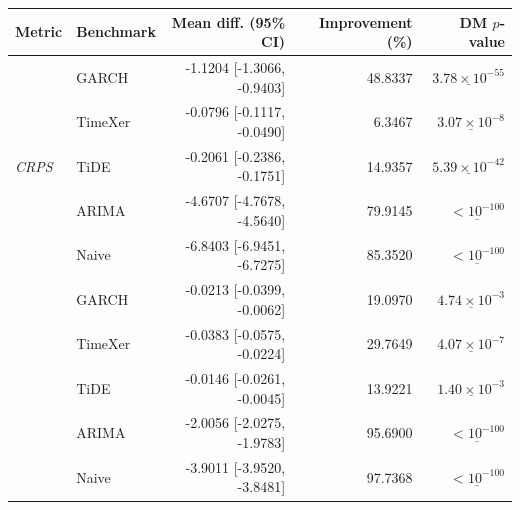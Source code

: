 \begin{tabular}{llrrr}
\toprule
Metric & Benchmark & Mean diff. (95\% CI) & Improvement (\%) & DM $p$-value \\
\midrule
\multirow{5}{*}{\textit{CRPS}}
 & GARCH & -1.1204 [-1.3066, -0.9403] & 48.8337 & $\underline{3.78 \times 10^{-55}}$ \\
 & TimeXer & -0.0796 [-0.1117, -0.0490] & 6.3467 & $\underline{3.07 \times 10^{-8}}$ \\
 & TiDE & -0.2061 [-0.2386, -0.1751] & 14.9357 & $\underline{5.39 \times 10^{-42}}$ \\
 & ARIMA & -4.6707 [-4.7678, -4.5640] & 79.9145 & $\underline{< 10^{-100}}$ \\
 & Naive & -6.8403 [-6.9451, -6.7275] & 85.3520 & $\underline{< 10^{-100}}$ \\
\addlinespace \midrule
\multirow{5}{*}{\textit{twCRPS}}
 & GARCH & -0.0213 [-0.0399, -0.0062] & 19.0970 & $\underline{4.74 \times 10^{-3}}$ \\
 & TimeXer & -0.0383 [-0.0575, -0.0224] & 29.7649 & $\underline{4.07 \times 10^{-7}}$ \\
 & TiDE & -0.0146 [-0.0261, -0.0045] & 13.9221 & $\underline{1.40 \times 10^{-3}}$ \\
 & ARIMA & -2.0056 [-2.0275, -1.9783] & 95.6900 & $\underline{< 10^{-100}}$ \\
 & Naive & -3.9011 [-3.9520, -3.8481] & 97.7368 & $\underline{< 10^{-100}}$ \\
\bottomrule
\end{tabular}